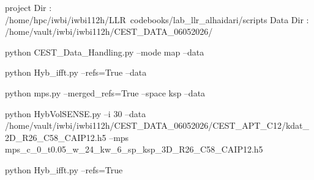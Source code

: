 project Dir : /home/hpc/iwbi/iwbi112h/LLR\ codebooks/lab_llr_alhaidari/scripts 
Data Dir : /home/vault/iwbi/iwbi112h/CEST_DATA_06052026/

python CEST_Data_Handling.py --mode map --data  

python Hyb_ifft.py --refs=True --data 

python mps.py --merged_refs=True  --space ksp --data

python HybVolSENSE.py --i 30 --data /home/vault/iwbi/iwbi112h/CEST_DATA_06052026/CEST_APT_C12/kdat_2D_R26_C58_CAIP12.h5 --mps mps_c_0_t0.05_w_24_kw_6_sp_ksp_3D_R26_C58_CAIP12.h5 

python Hyb_ifft.py --refs=True 
